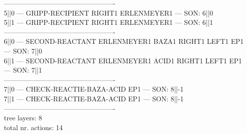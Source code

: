 -------------------------------------------------\\
  5||0 --- GRIPP-RECIPIENT RIGHT1 ERLENMEYER1 --- SON: 6||0\\
  5||1 --- GRIPP-RECIPIENT RIGHT1 ERLENMEYER1 --- SON: 6||1\\
-------------------------------------------------\\
  6||0 --- SECOND-REACTANT ERLENMEYER1 BAZA1 RIGHT1 LEFT1 EP1 --- SON: 7||0\\
  6||1 --- SECOND-REACTANT ERLENMEYER1 ACID1 RIGHT1 LEFT1 EP1 --- SON: 7||1\\
-------------------------------------------------\\
  7||0 --- CHECK-REACTIE-BAZA-ACID EP1 --- SON: 8||-1\\
  7||1 --- CHECK-REACTIE-BAZA-ACID EP1 --- SON: 8||-1\\
-------------------------------------------------\\
tree layers: 8\\
total nr. actions: 14\\
